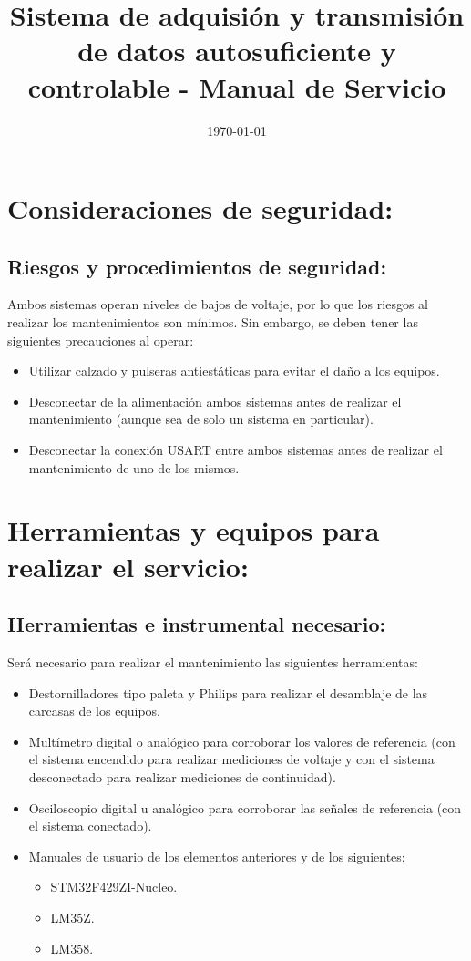 \documentclass[conference]{IEEEtran}
\date{\today}
\title{Sistema de adquisión y transmisión de datos autosuficiente y controlable - Manual de Servicio}
\begin{document}
\maketitle
\tableofcontents


\section{Consideraciones de seguridad:}
\label{sec:orgdbc0214}
\subsection{Riesgos y procedimientos de seguridad:}
\label{sec:orgd3031b4}
Ambos sistemas operan niveles de bajos de voltaje, por lo que los riesgos al realizar los mantenimientos son mínimos. Sin embargo, se deben tener las siguientes precauciones al operar:

\begin{itemize}
\item Utilizar calzado y pulseras antiestáticas para evitar el daño a los equipos.
\item Desconectar de la alimentación ambos sistemas antes de realizar el mantenimiento (aunque sea de solo un sistema en particular).
\item Desconectar la conexión USART entre ambos sistemas antes de realizar el mantenimiento de uno de los mismos.
\end{itemize}
\section{Herramientas y equipos para realizar el servicio:}
\label{sec:org02bb197}
\subsection{Herramientas e instrumental necesario:}
\label{sec:orge3339a5}
Será necesario para realizar el mantenimiento las siguientes herramientas:

\begin{itemize}
\item Destornilladores tipo paleta y Philips para realizar el desamblaje de las carcasas de los equipos.
\item Multímetro digital o analógico para corroborar los valores de referencia (con el sistema encendido para realizar mediciones de voltaje y con el sistema desconectado para realizar mediciones de continuidad).
\item Osciloscopio digital u analógico para corroborar las señales de referencia (con el sistema conectado).
\item Manuales de usuario de los elementos anteriores y de los siguientes:
\begin{itemize}
\item STM32F429ZI-Nucleo.
\item LM35Z.
\item LM358.
\end{itemize}
\end{itemize}
\end{document}
